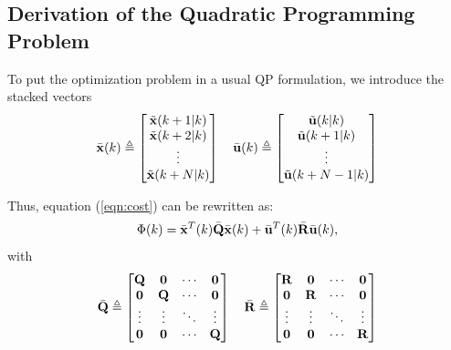 \documentclass[conference]{IEEEtran} %
\begin{document}
\subsection{Derivation of the Quadratic Programming Problem}
\label{sec:qp}

To put the optimization problem in a usual QP formulation, we introduce the stacked vectors
\begin{equation*}
	\bar{\bf x}(k) \triangleq \begin{bmatrix}
		\tilde{\bf x}(k+1|k) \\ \tilde{\bf x}(k+2|k) \\ \vdots \\ \tilde{\bf x}(k+N|k) 
	\end{bmatrix} \quad
	\bar{\bf u}(k) \triangleq \begin{bmatrix}
		\tilde{\bf u}(k|k)  \\ \tilde{\bf u}(k+1|k) \\ \vdots \\ \tilde{\bf u}(k+N-1|k)
	\end{bmatrix}
\end{equation*}

Thus, equation (\ref{eqn:cost}) can be rewritten as:
\begin{equation}\label{eqn:cost2}
	\Phi(k) = \bar{\bf x}^T(k)\bar{\bf Q}\bar{\bf x}(k) + \bar{\bf u}^T(k)\bar{\bf R}\bar{\bf u}(k),
\end{equation}
with
\begin{equation*}
	\bar {\bf Q} \triangleq \begin{bmatrix}
		{\bf Q} & {\bf 0} & \cdots & {\bf 0} \\
		{\bf 0} & {\bf Q} & \cdots & {\bf 0} \\
		\vdots  & \vdots  & \ddots & \vdots  \\
		{\bf 0} & {\bf 0} & \cdots & {\bf Q}
	\end{bmatrix} \quad
	\bar {\bf R} \triangleq \begin{bmatrix}
		{\bf R} & {\bf 0} & \cdots & {\bf 0} \\
		{\bf 0} & {\bf R} & \cdots & {\bf 0} \\
		\vdots  & \vdots  & \ddots & \vdots  \\
		{\bf 0} & {\bf 0} & \cdots & {\bf R}
	\end{bmatrix}
\end{equation*}
\end{document}
